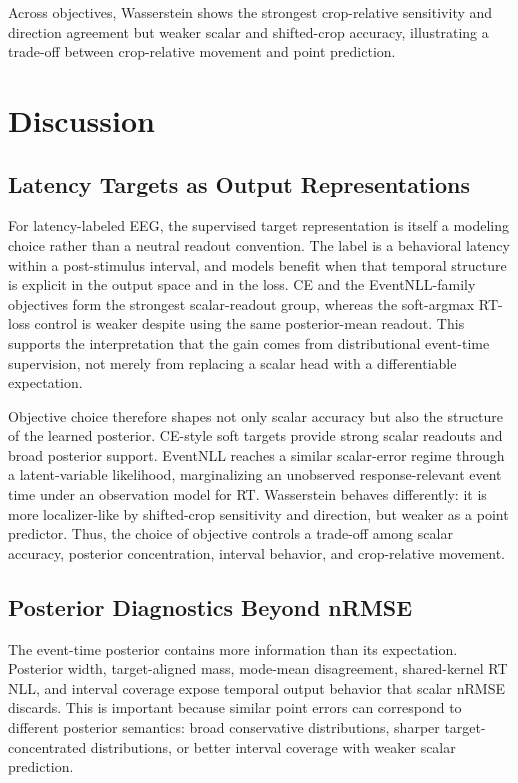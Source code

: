 \documentclass[12pt]{article}
\begin{document}
Across objectives, Wasserstein shows the strongest crop-relative sensitivity and direction agreement but weaker scalar and shifted-crop accuracy, illustrating a trade-off between crop-relative movement and point prediction.

\FloatBarrier

\section{Discussion}

\subsection{Latency Targets as Output Representations}

For latency-labeled EEG, the supervised target representation is itself a modeling choice rather than a neutral readout convention. The label is a behavioral latency within a post-stimulus interval, and models benefit when that temporal structure is explicit in the output space and in the loss. CE and the EventNLL-family objectives form the strongest scalar-readout group, whereas the soft-argmax RT-loss control is weaker despite using the same posterior-mean readout. This supports the interpretation that the gain comes from distributional event-time supervision, not merely from replacing a scalar head with a differentiable expectation.

Objective choice therefore shapes not only scalar accuracy but also the structure of the learned posterior. CE-style soft targets provide strong scalar readouts and broad posterior support. EventNLL reaches a similar scalar-error regime through a latent-variable likelihood, marginalizing an unobserved response-relevant event time under an observation model for RT. Wasserstein behaves differently: it is more localizer-like by shifted-crop sensitivity and direction, but weaker as a point predictor. Thus, the choice of objective controls a trade-off among scalar accuracy, posterior concentration, interval behavior, and crop-relative movement.

\subsection{Posterior Diagnostics Beyond nRMSE}

The event-time posterior contains more information than its expectation. Posterior width, target-aligned mass, mode-mean disagreement, shared-kernel RT NLL, and interval coverage expose temporal output behavior that scalar nRMSE discards. This is important because similar point errors can correspond to different posterior semantics: broad conservative distributions, sharper target-concentrated distributions, or better interval coverage with weaker scalar prediction.
\end{document}
